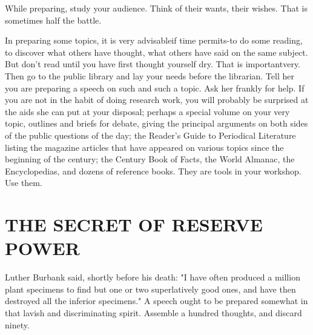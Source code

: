 \documentclass[10pt]{article}
\begin{document}
While preparing, study your audience. Think of their wants, their wishes. That is sometimes half the battle.

In preparing some topics, it is very advisableif time permits-to do some reading, to discover what others have thought, what others have said on the same subject. But don't read until you have first thought yourself dry. That is importantvery. Then go to the public library and lay your needs before the librarian. Tell her you are preparing a speech on such and such a topic. Ask her frankly for help. If you are not in the habit of doing research work, you will probably be surprised at the aids she can put at your disposal; perhaps a special volume on your very topic, outlines and briefs for debate, giving the principal arguments on both sides of the public questions of the day; the Reader's Guide to Periodical Literature listing the magazine articles that have appeared on various topics since the beginning of the century; the Century Book of Facts, the World Almanac, the Encyclopedias, and dozens of reference books. They are tools in your workshop. Use them.

\section*{THE SECRET OF RESERVE POWER}
Luther Burbank said, shortly before his death: "I have often produced a million plant specimens to find but one or two superlatively good ones, and have then destroyed all the inferior specimens." A speech ought to be prepared somewhat in that lavish and discriminating spirit. Assemble a hundred thoughts, and discard ninety.
\end{document}

